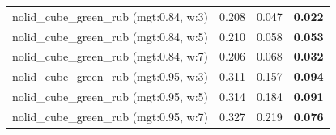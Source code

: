 \begin{table}[H]
{\begin{tabular}{l ccc}
        nolid\_cube\_green\_rub (mgt:0.84, w:3) & 0.208 & 0.047 & \textbf{0.022} \\
        nolid\_cube\_green\_rub (mgt:0.84, w:5) & 0.210 & 0.058 & \textbf{0.053} \\
        nolid\_cube\_green\_rub (mgt:0.84, w:7) & 0.206 & 0.068 & \textbf{0.032} \\
        nolid\_cube\_green\_rub (mgt:0.95, w:3) & 0.311 & 0.157 & \textbf{0.094} \\
        nolid\_cube\_green\_rub (mgt:0.95, w:5) & 0.314 & 0.184 & \textbf{0.091} \\
        nolid\_cube\_green\_rub (mgt:0.95, w:7) & 0.327 & 0.219 & \textbf{0.076} \\
        \bottomrule
    \end{tabular}
    }
\end{table}



\vspace{1cm}

\clearpage

